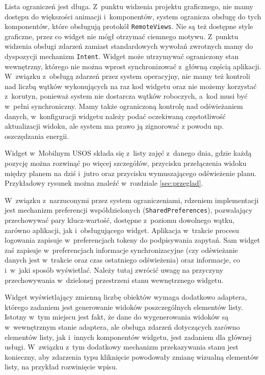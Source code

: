 \documentclass{pracamgr}
\begin{document}
Lista ograniczeń jest długa. Z~punktu widzenia projektu graficznego, nie mamy dostępu
do większości animacji i~komponentów, system ogranicza obsługę do tych komponentów,
które obsługują protokół \texttt{RemoteViews}. Nie są też dostępne style graficzne,
przez co widget nie mógł otrzymać ciemnego motywu. Z~punktu widzenia obsługi zdarzeń
zamiast standardowych wywołań zwrotnych mamy do dyspozycji mechanizm \texttt{Intent}.
Widget może utrzymywać ograniczony stan wewnętrzny, którego nie można wprost
synchronizować z~główną częścią aplikacji. W~związku z~obsługą zdarzeń przez system
operacyjny, nie mamy też kontroli nad liczbą wątków wykonujących na raz kod widgetu
oraz nie możemy korzystać z~korutyn, ponieważ system nie dostarcza wątków roboczych,
a~kod musi być w~pełni synchroniczny. Mamy także ograniczoną kontrolę nad odświeżaniem
danych, w~konfiguracji widgetu należy podać oczekiwaną częstotliwość aktualizacji widoku,
ale system ma prawo ją zignorować z powodu np. oszczędzania energii.

Widget w~Mobilnym USOS składa się z~listy zajęć z~danego dnia, gdzie każdą pozycję można
rozwinąć po więcej szczegółów, przycisku przełączenia widoku między planem na dziś i~jutro
oraz przycisku wymuszającego odświeżenie planu. Przykładowy rysunek można znaleźć w~rozdziale
\ref{sec:przeglad}.

W~związku z~narzuconymi przez system ograniczeniami, rdzeniem implementacji jest mechanizm
preferencji współdzielonych (\texttt{SharedPreferences}), pozwalający przechowywać pary
klucz-wartość, dostępne z~poziomu dowolnego wątku, zarówno aplikacji, jak i~obsługującego
widget. Aplikacja w~trakcie procesu logowania zapisuje w~preferencjach tokeny do podpisywania
zapytań. Sam widget zaś zapisuje w~preferencjach informacje synchronizacyjne (czy odświeżanie
danych jest w~trakcie oraz czas ostatniego odświeżenia) oraz informacje, co i~w~jaki
sposób wyświetlać. Należy tutaj zwrócić uwagę na przyczyny przechowywania w~dzielonej
przestrzeni stanu wewnętrznego widgetu.

Widget wyświetlający zmienną liczbę obiektów wymaga dodatkowo adaptera, którego zadaniem jest
generowanie widoków poszczególnych elementów listy. Istotny w~tym miejscu jest fakt, że dane
do wygenerowania widoków są w~wewnętrznym stanie adaptera, ale obsługa zdarzeń dotyczących
zarówno elementów listy, jak i~innych komponentów widgetu, jest zadaniem dla głównej usługi.
W~związku z~tym dodatkowy mechanizm przekazywania stanu jest konieczny, aby zdarzenia typu
kliknięcie powodowały zmianę wizualną elementów listy, na przykład rozwinięcie wpisu.
\end{document}
